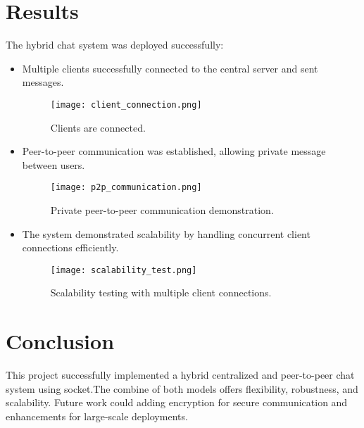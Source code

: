 \documentclass[12pt]{article}
\begin{document}
\section{Results}
The hybrid chat system was deployed successfully:
\begin{itemize}
    \item Multiple clients successfully connected to the central server and sent messages.
    \begin{figure}[H]
        \centering
        \texttt{[image: client\_connection.png]}
        \caption{Clients are connected.}
    \end{figure}
    \item Peer-to-peer communication was established, allowing private message between users.
    \begin{figure}[H]
        \centering
        \texttt{[image: p2p\_communication.png]}
        \caption{Private peer-to-peer communication demonstration.}
    \end{figure}
    \item The system demonstrated scalability by handling concurrent client connections efficiently.
    \begin{figure}[H]
        \centering
        \texttt{[image: scalability\_test.png]}
        \caption{Scalability testing with multiple client connections.}
    \end{figure}
\end{itemize}

\section{Conclusion}
This project successfully implemented a hybrid centralized and peer-to-peer chat system using socket.The combine of both models offers flexibility, robustness, and scalability. Future work could adding encryption for secure communication and enhancements for large-scale deployments.
\end{document}
